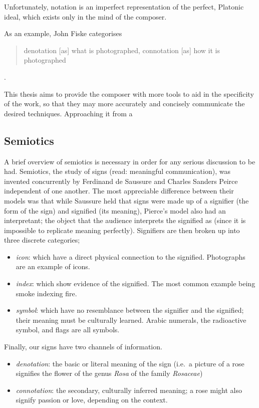 Unfortunately, notation is an imperfect representation of the perfect, Platonic ideal, which exists only in the mind of the composer. 

As an example, John Fiske categorises \begin{quotation}
    denotation [as] what is photographed, connotation [as] how it is photographed
\end{quotation}.



This thesis aims to provide the composer with more tools to aid in the specificity of the work, so that they may more accurately and concisely communicate the desired techniques.
Approaching it from a 

\subsection{Semiotics}
A brief overview of semiotics is necessary in order for any serious discussion to be had.
Semiotics, the study of signs (read: meaningful communication), was invented concurrently by Ferdinand de Saussure and Charles Sanders Peirce independent of one another.
The most appreciable difference between their models was that while Saussure held that signs were made up of a signifier (the form of the sign) and signified (its meaning), Pierce's model also had an interpretant; the object that the audience interprets the signified as (since it is impossible to replicate meaning perfectly).
Signifiers are then broken up into three discrete categories; 
\begin{itemize}
\item \emph{\gls{icon}}: which have a direct physical connection to the signified. Photographs are an example of icons.
\item \emph{\gls{index}}: which show evidence of the signified. The most common example being smoke indexing fire.
\item \emph{\gls{symbol}}: which have no resemblance between the signifier and the signified; their meaning must be culturally learned. Arabic numerals, the radioactive symbol, and flags are all symbols.
\end{itemize}

Finally, our signs have two channels of information.
\begin{itemize}
\item \emph{\gls{denotation}}: the basic or literal meaning of the sign (i.e.\ a picture of a rose signifies the flower of the genus \emph{Rosa} of the family \emph{Rosaceae})
\item \emph{\gls{connotation}}: the secondary, culturally inferred meaning; a rose might also signify passion or love, depending on the context.
\end{itemize}

